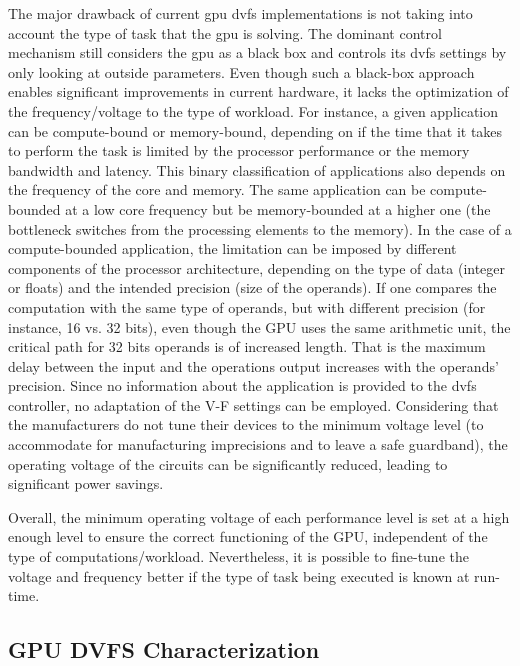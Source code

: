 The major drawback of current \acrshort{gpu} \acrshort{dvfs} implementations is not taking into account the type of task that the \acrshort{gpu} is solving. The dominant control mechanism still considers the \acrshort{gpu} as a black box and controls its \acrshort{dvfs} settings by only looking at outside parameters. Even though such a black-box approach enables significant improvements in current hardware, it lacks the optimization of the frequency/voltage to the type of workload. For instance, a given application can be compute-bound or memory-bound, depending on if the time that it takes to perform the task is limited by the processor performance or the memory bandwidth and latency. This binary classification of applications also depends on the frequency of the core and memory. The same application can be compute-bounded at a low core frequency but be memory-bounded at a higher one \cite{guerreiro_dvfs-aware_2019} (the bottleneck switches from the processing elements to the memory). In the case of a compute-bounded application, the limitation can be imposed by different components of the processor architecture, depending on the type of data (integer or floats) and the intended precision (size of the operands). If one compares the computation with the same type of operands, but with different precision (for instance, 16 vs. 32 bits), even though the GPU uses the same arithmetic unit, the critical path for 32 bits operands is of increased length. That is the maximum delay between the input and the operations output increases with the operands' precision. 
Since no information about the application is provided to the \acrshort{dvfs} controller, no adaptation of the V-F settings can be employed.
Considering that the manufacturers do not tune their devices to the minimum voltage level (to accommodate for manufacturing imprecisions and to leave a safe guardband), the operating voltage of the circuits can be significantly reduced, leading to significant power savings. 

Overall, the minimum operating voltage of each performance level is set at a high enough level to ensure the correct functioning of the GPU, independent of the type of computations/workload. Nevertheless, it is possible to fine-tune the voltage and frequency better if the type of task being executed is known at run-time.

\subsection{GPU DVFS Characterization}

